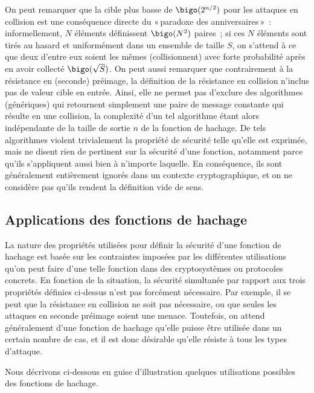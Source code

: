 On peut remarquer que la cible plus basse de 
$\bigo(2^{n/2})$ pour les attaques en collision est une conséquence directe du
«\,paradoxe des anniversaires\,»~: informellement, 
$N$ éléments définissent $\bigo(N^2)$ paires~; si ces $N$ éléments sont tirés au hasard et uniformément dans un ensemble de taille $S$,
on s'attend à ce que deux d'entre eux soient les mêmes (collisionnent) avec forte probabilité après en avoir collecté
$\bigo(\sqrt{S})$. 
On peut aussi remarquer que contrairement à la résistance en (seconde) préimage, la définition de la résistance en collision n'inclus pas de valeur
cible en entrée.
Ainsi, elle ne permet pas d'exclure des algorithmes (génériques) qui retournent simplement une paire de message constante qui résulte en une collision,
la complexité d'un tel algorithme étant alors indépendante de la taille de sortie $n$ de la fonction de hachage.
De tels algorithmes violent trivialement la propriété de sécurité telle qu'elle est exprimée, mais ne disent rien de pertinent sur la sécurité d'une fonction,
notamment parce qu'ils
s'appliquent aussi bien à n'importe laquelle. En conséquence, ils sont généralement entièrement ignorés dans un contexte cryptographique, et
on ne considère pas qu'ils rendent la
définition vide de sens.

\subsection{Applications des fonctions de hachage}

La nature des propriétés utilisées pour définir la sécurité d'une fonction de hachage est basée sur les contraintes imposées par les différentes utilisations qu'on peut faire
d'une telle fonction dans des cryptosystèmes ou protocoles concrets.
En fonction de la situation, la sécurité simultanée par rapport aux trois propriétés définies ci-dessus n'est pas forcément nécessaire. Par exemple, il se peut que la résistance
en collision ne soit pas nécessaire, ou que seules les attaques en seconde préimage soient une menace. Toutefois, on attend généralement d'une fonction de hachage qu'elle puisse être utilisée
dans un certain nombre de cas, et il est donc désirable qu'elle résiste à tous les types d'attaque.

Nous décrivons ci-dessous en guise d'illustration quelques utilisations possibles des fonctions de hachage.


